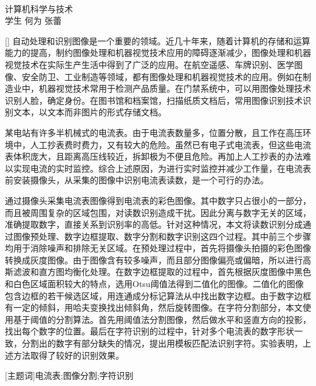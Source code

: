 \begin{center}
\vspace*{18pt}
{\heiti{}\thesistitle}\\[18pt]
\quad 计算机科学与技术\\[12pt]
{\kaishu 学生} \quad 何为  \quad 张蕾\\[24pt]
\end{center}\par

[{}]
自动处理和识别图像是一个重要的领域。近几十年来，随着计算机的存储和运算能力的提高，制约图像处理和机器视觉技术应用的障碍逐渐减少，图像处理和机器视觉技术在实际生产生活中得到了广泛的应用。在航空遥感、车牌识别、医学图像、安全防卫、工业制造等领域，都有图像处理和机器视觉技术的应用。例如在制造业中，机器视觉技术常用于检测产品质量。在门禁系统中，可以用图像处理技术识别人脸，确定身份。在图书馆和档案馆，扫描纸质文档后，常用图像识别技术识别文本，以文本而非图片的形式存储文档。

某电站有许多半机械式的电流表。由于电流表数量多，位置分散，且工作在高压环境中，人工抄表费时费力，又有较大的危险。虽然已有电子式电流表，但这些电流表体积庞大，且距离高压线较近，拆卸极为不便且危险。再加上人工抄表的办法难以实现电流的实时监控。综合上述原因，为进行实时监控并减少工作量，在电流表前安装摄像头，从采集的图像中识别电流表读数，是一个可行的办法。

通过摄像头采集电流表图像得到电流表的彩色图像。其中数字只占很小的一部分，而且被周围复杂的区域包围，对读数识别造成干扰。因此分离与数字无关的区域，准确提取数字，直接关系到识别率的高低。针对这种情况，本文将读数识别分成通过图像预处理、数字边框提取、数字分割和数字识别这四个过程。其中前三个步骤均用于消除噪声和排除无关区域。在预处理过程中，首先将摄像头拍摄的彩色图像转换成灰度图像。由于图像含有较多噪声，而且部分图像偏亮或偏暗，所以进行高斯滤波和直方图均衡化处理。在数字边框提取的过程中，首先根据灰度图像中黑色和白色区域面积较大的特点，选用Otsu阈值法得到二值化的图像。二值化的图像包含边框的若干候选区域，用连通成分标记算法从中找出数字边框。由于数字边框有一定的倾斜，用哈夫变换找出倾斜角，然后旋转图像。在字符分割部分，本文使用基于阈值的分割算法。首先用阈值法分割图像，然后做水平和竖直方向的投影，找出每个数字的位置。最后在字符识别的过程中，针对多个电流表的数字形状一致，分割出的数字有部分缺失的情况，提出用模板匹配法识别字符。实验表明，上述方法取得了较好的识别效果。

\vspace{10pt}

[{\heiti 主题词}]{\kaishu 电流表;\quad 图像分割;\quad 字符识别}

